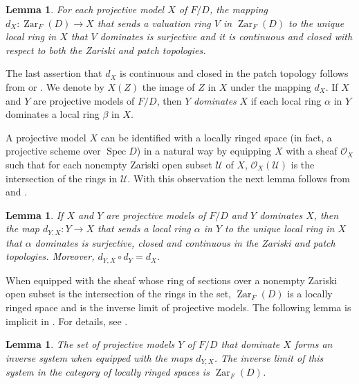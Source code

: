 \documentclass[preprint, 11pt,nonatbib]{elsarticle}
\DeclareMathOperator{\Spec}{Spec}
\DeclareMathOperator{\Zar}{Zar}
\newtheorem{lemma}[theorem]{Lemma}
\theoremstyle{definition}
\numberwithin{theorem}{section}
\begin{document}

\begin{lemma} \label{ccs}
{\em \cite[Lemma 4, p.~117]{MR0389876}} For each projective model $X$ of $F/D$, the   mapping $d_X:\Zar_F(D)\rightarrow X$ that sends a valuation ring $V$  in $\Zar_F(D)$ to the unique local ring in $X$ that  $V$ dominates  is surjective  and it is  continuous and closed   with respect to both the Zariski and patch topologies. 
\end{lemma}

The last assertion that $d_X$ is continuous and closed in the patch topology follows from \cite[Theorem~4.1]{MR932760} or \cite[Remark~3.2]{MR3299704}.
We denote by $X(Z)$ the image of $Z$ in $X$ under the mapping $d_X$.  
If $X$ and $Y$ are projective models of $F/D$, then $Y$ {\it dominates} $X$ if each local ring $\alpha$ in $Y$ dominates a local ring $\beta$ in $X$.  


A projective model $X$ can be identified with a locally ringed space (in fact, a projective scheme over $\Spec D$) in a natural way by equipping $X$ with a sheaf ${\mathcal{O}}_X$ such that for each nonempty Zariski open subset ${\mathcal{U}}$ of $X$, ${\mathcal{O}}_X({\mathcal{U}})$ is the intersection of the rings in ${\mathcal{U}}$. 
With this observation the next lemma follows from \cite[Exercise~II.3.2, p. 91]{MR0463157} and
\cite[Lemma~5, p.~119]{MR0389876}. 

\begin{lemma}  If $X$ and $Y$ are projective models of $F/D$ and $Y$ dominates $X$, then the map $d_{Y,X}:Y \rightarrow X$ that sends a local ring $\alpha$ in $Y$ to the unique local ring in $X$ that $\alpha$ dominates is surjective, closed and continuous in the Zariski and patch topologies. Moreover, $d_{Y,X} \circ d_Y = d_X$. 
\end{lemma} 

When equipped with the sheaf whose ring of sections over a  nonempty Zariski open subset  is the intersection of the rings in the  set,  $\Zar_F(D)$ is a locally ringed space and is the inverse limit of projective models. The following lemma is implicit in \cite{MR0389876}. For details, see \cite[Proposition~3.3(4)]{MR3299704}.

\begin{lemma} \label{inverse limit}   The set of projective models $Y$ of $F/D$ that dominate $X$ forms an inverse  system when equipped with the maps $d_{Y,X}$. The inverse limit of this system in the category of locally ringed spaces is $\Zar_F(D)$.  
\end{lemma} 
\end{document}
